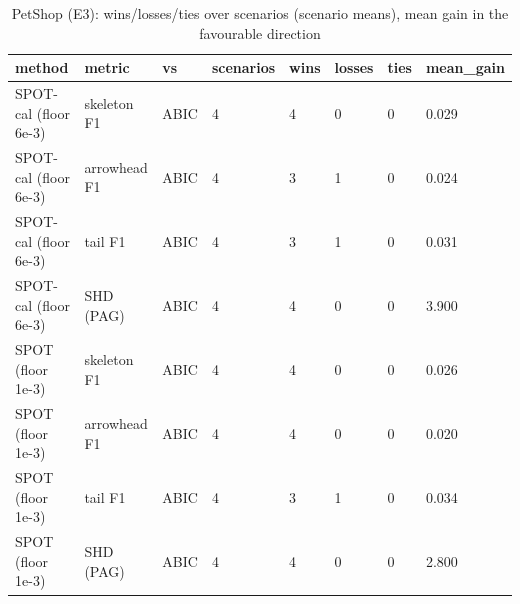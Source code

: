 \begin{table}[t]
\centering\footnotesize
\caption{PetShop (E3): wins/losses/ties over scenarios (scenario means), mean gain in the favourable direction}\label{tab:T2b_petshop_wlt}
\begin{tabular}{@{}llllllll@{}}
\toprule
method & metric & vs & scenarios & wins & losses & ties & mean\_gain\\
\midrule
SPOT-cal (floor 6e-3) & skeleton F1 & ABIC & 4 & 4 & 0 & 0 & 0.029\\
SPOT-cal (floor 6e-3) & arrowhead F1 & ABIC & 4 & 3 & 1 & 0 & 0.024\\
SPOT-cal (floor 6e-3) & tail F1 & ABIC & 4 & 3 & 1 & 0 & 0.031\\
SPOT-cal (floor 6e-3) & SHD (PAG) & ABIC & 4 & 4 & 0 & 0 & 3.900\\
SPOT (floor 1e-3) & skeleton F1 & ABIC & 4 & 4 & 0 & 0 & 0.026\\
SPOT (floor 1e-3) & arrowhead F1 & ABIC & 4 & 4 & 0 & 0 & 0.020\\
SPOT (floor 1e-3) & tail F1 & ABIC & 4 & 3 & 1 & 0 & 0.034\\
SPOT (floor 1e-3) & SHD (PAG) & ABIC & 4 & 4 & 0 & 0 & 2.800\\
\bottomrule
\end{tabular}
\end{table}

